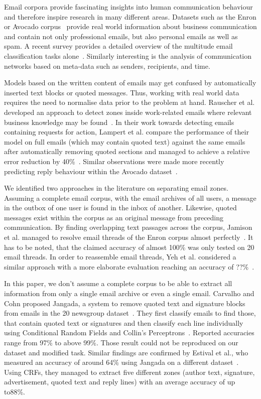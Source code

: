 \documentclass{llncs}
\begin{document}
Email corpora provide fascinating insights into human communication behaviour and therefore inspire research in many different areas.
Datasets such as the Enron or Avocado corpus~\cite{avocado,enron} provide real world information about business communication and contain not only professional emails, but also personal emails as well as spam.
A recent survey provides a detailed overview of the multitude email classification tasks alone~\cite{classification}.
Similarly interesting is the analysis of communication networks based on meta-data such as senders, recipients, and time.

Models based on the written content of emails may get confused by automatically inserted text blocks or quoted messages.
Thus, working with real world data requires the need to normalise data prior to the problem at hand.
Rauscher et al. developed an approach to detect zones inside work-related emails where relevant business knowledge may be found~\cite{rauscher2015context}.
In their work towards detecting emails containing requests for action, Lampert et al. compare the performance of their model on full emails (which may contain quoted text) against the same emails after automatically removing quoted sections and managed to achieve a relative error reduction by 40\%~\cite{rfa}.
Similar observations were made more recently predicting reply behaviour within the Avocado dataset~\cite{replying}.

We identified two approaches in the literature on separating email zones.
Assuming a complete email corpus, with the email archives of all users, a message in the outbox of one user is found in the inbox of another.
Likewise, quoted messages exist within the corpus as an original message from preceding communication.
By finding overlapping text passages across the corpus, Jamison et al. managed to resolve email threads of the Enron corpus almost perfectly~\cite{headerless}.
It has to be noted, that the claimed accuracy of almost 100\% was only tested on 20 email threads.
In order to reassemble email threads, Yeh et al. considered a similar approach with a more elaborate evaluation reaching an accuracy of ??\%~\cite{similarity}.

In this paper, we don't assume a complete corpus to be able to extract all information from only a single email archive or even a single email.
Carvalho and Cohn proposed Jangada, a system to remove quoted text and signature blocks from emails in the 20 newsgroup dataset~\cite{signature,20news}.
They first classify emails to find those, that contain quoted text or signatures and then classify each line individually using Conditional Random Fields and Collin's Perceptrons~\cite{crf, cperceptron}.
Reported accuracies range from 97\% to above 99\%.
Those result could not be reproduced on our dataset and modified task.
Similar findings are confirmed by Estival et al., who measured an accuracy of around 64\% using Jangada on a different dataset~\cite{profiling}.
Using CRFs, they managed to extract five different zones (author text, signature, advertisement, quoted text and reply lines) with an average accuracy of up to88\%.
\end{document}
